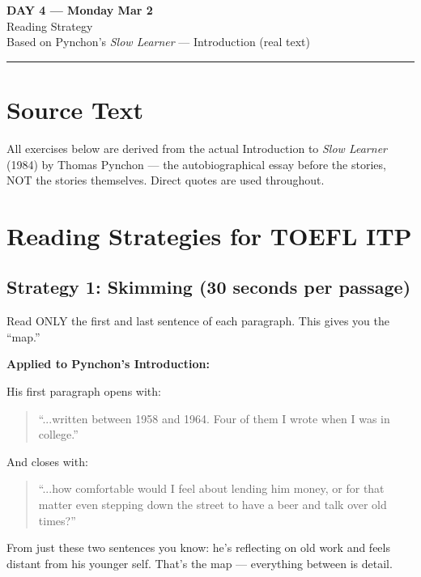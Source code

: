\documentclass[10pt,a4paper]{article}
\begin{document}
\begin{center}
{\LARGE \textbf{DAY 4 --- Monday Mar 2}}\\[4pt]
{\large Reading Strategy}\\[2pt]
{\normalsize Based on Pynchon's \emph{Slow Learner}
--- Introduction (real text)}\\[2pt]
\rule{\textwidth}{0.8pt}
\end{center}

\section*{Source Text}

\begin{tcolorbox}[colback=white, colframe=black]
All exercises below are derived from the actual Introduction to
\emph{Slow Learner} (1984) by Thomas Pynchon --- the autobiographical
essay before the stories, NOT the stories themselves. Direct quotes
are used throughout.
\end{tcolorbox}

\section*{Reading Strategies for TOEFL ITP}

\subsection*{Strategy 1: Skimming (30 seconds per passage)}

Read ONLY the first and last sentence of each paragraph. This gives
you the ``map.''

\textbf{Applied to Pynchon's Introduction:}

His first paragraph opens with:
\begin{quote}\small
``...written between 1958 and 1964. Four of them I wrote when I was
in college.''
\end{quote}
And closes with:
\begin{quote}\small
``...how comfortable would I feel about lending him money, or for
that matter even stepping down the street to have a beer and talk
over old times?''
\end{quote}

From just these two sentences you know: he's reflecting on old
work and feels distant from his younger self. That's the map ---
everything between is detail.
\end{document}
